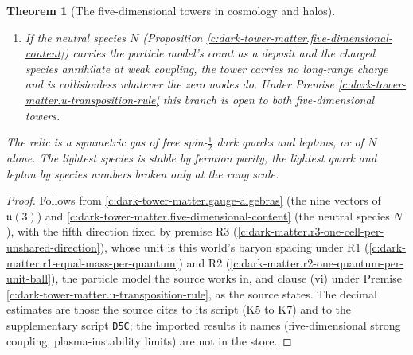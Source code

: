 \documentclass[11pt]{article}
\newtheorem{theorem}{Theorem}[section]
\theoremstyle{definition}
\theoremstyle{plain}
\providecommand{\uu}{}\renewcommand{\uu}{\mathfrak{u}}
\providecommand{\file}{}\renewcommand{\file}[1]{\texttt{#1}}
\begin{document}
\begin{theorem}[The five-dimensional towers in cosmology and halos]
\begin{enumerate}
\item[(vi)] If the neutral species $N$ (Proposition \ref{c:dark-tower-matter.five-dimensional-content}) carries the particle model's count as a deposit and the charged species annihilate at weak coupling, the tower carries no long-range charge and is collisionless whatever the zero modes do. Under Premise \ref{c:dark-tower-matter.u-transposition-rule} this branch is open to both five-dimensional towers.
\end{enumerate}
The relic is a symmetric gas of free spin-$\tfrac{1}{2}$ dark quarks and leptons, or of $N$ alone. The lightest species is stable by fermion parity, the lightest quark and lepton by species numbers broken only at the rung scale.
\end{theorem}
\begin{proof}
Follows from \ref{c:dark-tower-matter.gauge-algebras} (the nine vectors of $\uu(3)$) and \ref{c:dark-tower-matter.five-dimensional-content} (the neutral species $N$), with the fifth direction fixed by premise R3 (\ref{c:dark-matter.r3-one-cell-per-unshared-direction}), whose unit is this world's baryon spacing under R1 (\ref{c:dark-matter.r1-equal-mass-per-quantum}) and R2 (\ref{c:dark-matter.r2-one-quantum-per-unit-ball}), the particle model the source works in, and clause (vi) under Premise \ref{c:dark-tower-matter.u-transposition-rule}, as the source states. The decimal estimates are those the source cites to its script (K5 to K7) and to the supplementary script \file{D5C}; the imported results it names (five-dimensional strong coupling, plasma-instability limits) are not in the store.

\end{proof}
\end{document}
